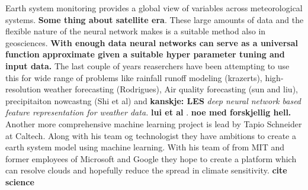Earth system monitoring provides a global view of variables across meteorological systems. \textbf{Some thing about satellite era}. These large amounts of data and the flexible nature of the neural network makes is a suitable method also in geosciences. \textbf{With enough data neural networks can serve as a universal function approximate given a suitable hyper parameter tuning and input data.} The last couple of years reaserchers have been attempting to use this for wide range of problems like rainfall runoff modeling (krazerts), high-resolution weather forecasting (Rodrigues), Air quality forecasting (sun and liu), precipitaiton nowcastng (Shi et al) and \textbf{kanskje: LES} \textit{deep neural network based feature representation for weather data.} \textbf{lui et al }. \textbf{noe med forskjellig hell.} Another more comprehensive machine learning project is lead by Tapio Schneider at Caltech. Along with his team og technologist they have ambitions to create a earth system model using machine learning. With his team of from MIT and former employees of Microsoft and Google they hope to create a platform which can resolve clouds and hopefully reduce the spread in climate sensitivity. \textbf{cite science}